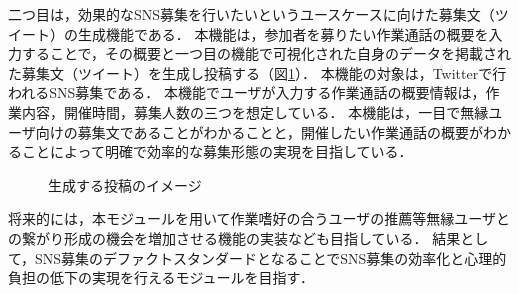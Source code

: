 二つ目は，効果的なSNS募集を行いたいというユースケースに向けた募集文（ツイート）の生成機能である．
本機能は，参加者を募りたい作業通話の概要を入力することで，その概要と一つ目の機能で可視化された自身のデータを掲載された募集文（ツイート）を生成し投稿する（図\ref{fig:tweet_image}）．
本機能の対象は，Twitterで行われるSNS募集である．
本機能でユーザが入力する作業通話の概要情報は，作業内容，開催時間，募集人数の三つを想定している．
本機能は，一目で無縁ユーザ向けの募集文であることがわかることと，開催したい作業通話の概要がわかることによって明確で効率的な募集形態の実現を目指している．

\begin{figure}
    \centering
    \caption{生成する投稿のイメージ}
    \label{fig:tweet_image}
\end{figure}

将来的には，本モジュールを用いて作業嗜好の合うユーザの推薦等無縁ユーザとの繋がり形成の機会を増加させる機能の実装なども目指している．
結果として，SNS募集のデファクトスタンダードとなることでSNS募集の効率化と心理的負担の低下の実現を行えるモジュールを目指す．
